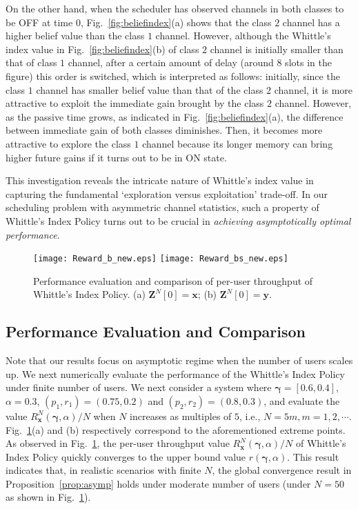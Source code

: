\documentclass[11pt,twocolumn]{IEEEtran}
\begin{document}
On the other hand, when the scheduler has observed channels in both
classes to be OFF at time $0$, Fig.~\ref{fig:beliefindex}(a) shows
that the class $2$ channel has a higher belief value than the class
$1$ channel. However, although the Whittle's index value in
Fig.~\ref{fig:beliefindex}(b) of class $2$ channel is initially
smaller than that of class $1$ channel, after a certain amount of
delay (around $8$ slots in the figure) this order is switched, which
is interpreted as follows: initially, since the class $1$
channel has smaller belief value than that of the class $2$ channel,
it is more attractive to exploit the immediate gain brought by the
class $2$ channel. However, as the passive time grows, as indicated
in Fig.~\ref{fig:beliefindex}(a), the difference between immediate
gain of both classes diminishes. Then, it becomes more attractive to
explore the class $1$ channel because its longer memory can
bring higher future gains if it turns out to be in ON state.

This investigation reveals the intricate nature of Whittle's index
value in capturing the fundamental `exploration versus exploitation'
trade-off. In our scheduling problem with asymmetric channel
statistics, such a property of Whittle's Index Policy turns out to
be crucial in \emph{achieving asymptotically optimal performance}.

\begin{figure}
\centering
\texttt{[image: Reward\_b\_new.eps]}
\texttt{[image: Reward\_bs\_new.eps]}
\vspace{-3pt} \caption{Performance evaluation and comparison of per-user throughput of Whittle's Index Policy. (a) ${\bm Z}^N[0]=\bm x$; (b) $\bm Z^N[0]=\bm y$.}
\vspace{-15pt}
\label{fig:realistic}
\end{figure}

\subsection{Performance Evaluation and Comparison}

Note that our results focus on asymptotic regime when the number of users scales up. We next numerically evaluate the performance of the Whittle's Index Policy under finite number of users. We next consider a system where $\bm \gamma{=}[0.6, 0.4]$, $\alpha{=}0.3$, $(p_1,r_1){=}(0.75,0.2)$ and $(p_2,r_2){=}(0.8,0.3)$, and evaluate the value $R^{N}_{\bm x}(\bm \gamma, \alpha)/N$ when $N$ increases as multiples of $5$, i.e., $N=5m, m=1,2,\cdots$. Fig.~\ref{fig:realistic}(a) and (b) respectively correspond to the aforementioned extreme points. As observed in Fig.~\ref{fig:realistic}, the per-user throughput value $R^{N}_{\bm x}(\bm \gamma, \alpha)/N$ of Whittle's Index Policy quickly converges to the upper bound value $r(\bm \gamma, \alpha)$. This result indicates that, in realistic scenarios with finite $N$, the global convergence result in Proposition~\ref{prop:asymp} holds under moderate number of users (under $N=50$ as shown in Fig.~\ref{fig:realistic}). 
\end{document}
